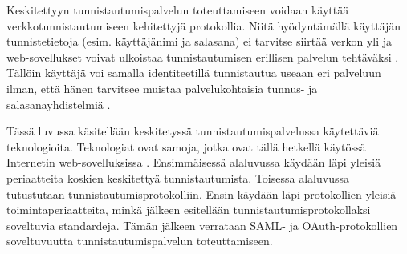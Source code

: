 Keskitettyyn tunnistautumispalvelun toteuttamiseen voidaan käyttää verkkotunnistautumiseen kehitettyjä protokollia. Niitä hyödyntämällä käyttäjän tunnistetietoja (esim. käyttäjänimi ja salasana) ei tarvitse siirtää verkon yli ja web-sovellukset voivat ulkoistaa tunnistautumisen erillisen palvelun tehtäväksi \cite{nisti}. Tällöin käyttäjä voi samalla identiteetillä tunnistautua useaan eri palveluun ilman, että hänen tarvitsee muistaa palvelukohtaisia tunnus- ja salasanayhdistelmiä \cite{open_identity}.

Tässä luvussa käsitellään keskitetyssä tunnistautumispalvelussa käytettäviä teknologioita. Teknologiat ovat samoja, jotka ovat tällä hetkellä käytössä Internetin web-sovelluksissa \cite{facebook}. Ensimmäisessä alaluvussa käydään läpi yleisiä periaatteita koskien keskitettyä tunnistautumista. Toisessa alaluvussa tutustutaan tunnistautumisprotokolliin. Ensin käydään läpi protokollien yleisiä toimintaperiaatteita, minkä jälkeen esitellään tunnistautumisprotokollaksi soveltuvia standardeja. Tämän jälkeen verrataan SAML- ja OAuth-protokollien soveltuvuutta tunnistautumispalvelun toteuttamiseen.